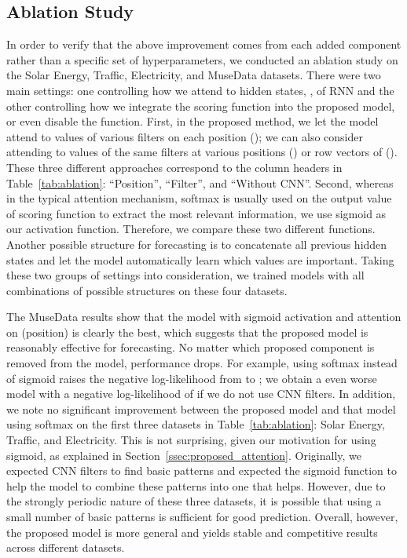 \subsection{Ablation Study}

In order to verify that the above improvement comes from each added component rather than a specific set of hyperparameters,
we conducted an ablation study on the Solar Energy, Traffic, Electricity, and MuseData datasets.
There were two main settings: one controlling how we attend to hidden states, , of RNN and the other controlling how we integrate the scoring function  into the proposed model, or even disable the function.
First, in the proposed method, we let the model attend to values of various filters on each position (); we can also consider attending to values of the same filters at various positions () or row vectors of  ().
These three different approaches correspond to the column headers in Table~\ref{tab:ablation}: ``Position'', ``Filter'', and ``Without CNN''.
Second, whereas in the typical attention mechanism, softmax is usually used on the output value of scoring function  to extract the most relevant information, we use sigmoid as our activation function.
Therefore, we compare these two different functions.
Another possible structure for forecasting is to concatenate all previous hidden states and let the model automatically learn which values are important.
Taking these two groups of settings into consideration, we trained models with all combinations of possible structures on these four datasets.

The MuseData results show that the model with sigmoid activation and attention on  (position) is clearly the best, which suggests that the proposed model is reasonably effective for forecasting.
No matter which proposed component is removed from the model, performance drops.
For example, using softmax instead of sigmoid raises the negative log-likelihood from  to ; we obtain a even worse model with a negative log-likelihood of  if we do not use CNN filters.
In addition, we note no significant improvement between the proposed model and that model using softmax on the first three datasets in Table~\ref{tab:ablation}: Solar Energy, Traffic, and Electricity.
This is not surprising, given our motivation for using sigmoid, as explained in Section~\ref{ssec:proposed_attention}.
Originally, we expected CNN filters to find basic patterns and expected the sigmoid function to help the model to combine these patterns into one that helps.
However, due to the strongly periodic nature of these three datasets, it is possible that using a small number of basic patterns is sufficient for good prediction.
Overall, however, the proposed model is more general and yields stable and competitive results across different datasets.

